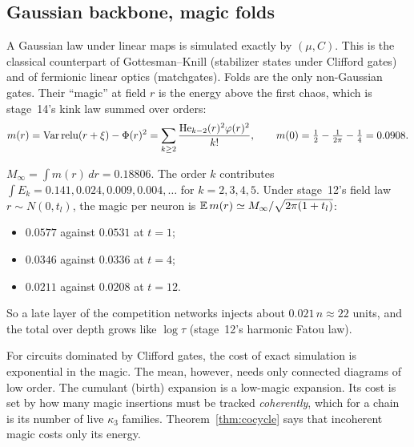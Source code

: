 \label{sec:complexity}
\subsection{Gaussian backbone, magic folds}
A Gaussian law under linear maps is simulated exactly by $(\mu,C)$. This is the classical counterpart of Gottesman--Knill
(stabilizer states under Clifford gates) and of fermionic linear optics (matchgates). Folds are the only non-Gaussian gates. Their
``magic'' at field $r$ is the energy above the first chaos, which is stage~14's kink law summed over orders:
\[
m(r)=\operatorname{Var}\operatorname{relu}(r+\xi)-\Phi(r)^2=\sum_{k\ge2}\frac{\mathrm{He}_{k-2}(r)^2\varphi(r)^2}{k!},\qquad m(0)=\tfrac12-\tfrac1{2\pi}-\tfrac14=0.0908 .
\]
\begin{proposition}
$M_\infty=\int m(r)\,dr=0.18806$. The order $k$ contributes $\int E_k=0.141,0.024,0.009,0.004,\dots$ for $k=2,3,4,5$. Under stage~12's field law
$r\sim N(0,t_l)$, the magic per neuron is $\mathbb E\,m(r)\simeq M_\infty/\sqrt{2\pi(1+t_l)}$:
\begin{itemize}[leftmargin=*]
\item $0.0577$ against $0.0531$ at $t=1$;
\item $0.0346$ against $0.0336$ at $t=4$;
\item $0.0211$ against $0.0208$ at $t=12$.
\end{itemize}
So a late layer of the competition networks injects about $0.021\,n\approx22$ units, and the total over depth grows like $\log\tau$
(stage~12's harmonic Fatou law).
\end{proposition}
For circuits dominated by Clifford gates, the cost of exact simulation is exponential in the magic. The mean, however, needs only
connected diagrams of low order. The cumulant (birth) expansion is a low-magic expansion. Its cost is set by how many magic insertions
must be tracked \emph{coherently}, which for a chain is its number of live $\kappa_3$ families. Theorem~\ref{thm:cocycle} says that
incoherent magic costs only its energy.


